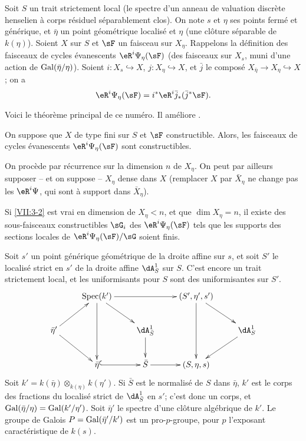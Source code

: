 Soit $S$ un trait strictement local (le spectre d'un anneau de valuation 
discrète henselien à corps résiduel séparablement clos). On note $s$ et 
$\eta$ ses points fermé et générique, et $\bar\eta$ un point 
géométrique localisé et $\eta$ (une clôture séparable de $k(\eta)$). 
Soient $X$ sur $S$ et $\sF$ un faisceau sur $X_\eta$. Rappelons la 
définition des faisceaux de cycles évanescents $\eR^i \Psi_\eta(\sF)$ (des 
faisceaux sur $X_s$, muni d'une action de $\operatorname{Gal}(\bar\eta/\eta)$). Soient 
$i:X_s\hookrightarrow X$, $j:X_\eta \hookrightarrow X$, et $\bar j$ le 
composé $X_{\bar\eta}\to X_\eta \hookrightarrow X$; on a 
\[
  \eR^i \Psi_\eta(\sF) = i^\ast \eR^i \bar j_\ast (\bar j^\ast \sF) \text{.} 
\]

Voici le théorème principal de ce numéro. Il améliore 
\cite[XIII 2.3.1, 2.4.2]{sga7}. 





\begin{theorem_}\label{VII:3-2}
On suppose que $X$ de type fini sur $S$ et $\sF$ constructible. Alors, les 
faisceaux de cycles évanescents $\eR^i \Psi_\eta(\sF)$ sont constructibles. 
\end{theorem_}

On procède par récurrence sur la dimension $n$ de $X_\eta$. On peut par 
ailleurs supposer -- et on suppose -- $X_\eta$ dense dans $X$ (remplacer $X$ 
par $\bar X_\eta$ ne change pas les $\eR^i \Psi$, qui sont à support dans 
$\bar X_\eta$). 





\begin{lemma_}\label{VII:3-3}
Si \ref{VII:3-2} est vrai en dimension de $X_\eta<n$, et que $\dim X_\eta=n$, 
il existe des sous-faisceaux constructibles $\sG_i$ des $\eR^i \Psi_\eta(\sF)$ 
tels que les supports des sections locales de $\eR^i\Psi_\eta(\sF)/\sG$ soient 
finis. 
\end{lemma_}

Soit $s'$ un point générique géométrique de la droite affine sur $s$, 
et soit $S'$ le localisé strict en $s'$ de la droite affine $\dA_S^1$ sur 
$S$. C'est encore un trait strictement local, et les uniformisants pour $S$ 
sont des uniformisantes sur $S'$. 
\[\xymatrix{
  & \spec(k') \ar[rr] \ar[dd] \ar[dr] 
    & & (S',\eta',s') \ar[dr] \ar[dd] \\
  \bar\eta' \ar[ur] \ar[dr] 
    & & \dA_{\bar S}^1 \ar[d]  
    & & \dA_S^1 \ar[dl] \\
  & \bar\eta\ar@{^{(}->}[r] 
    & \bar S \ar[r] 
    & (S,\eta,s) 
}\]
Soit $k'=k(\bar\eta)\otimes_{k(\eta)}k(\eta')$. Si $\bar S$ est le normalisé 
de $S$ dans $\bar\eta$, $k'$ est le corps des fractions du localisé strict 
de $\dA_{\bar S}^1$ en $s'$; c'est donc un corps, et 
$\operatorname{Gal}(\bar\eta/\eta)=\operatorname{Gal}(k'/\eta')$. Soit $\bar\eta'$ le spectre d'une 
clôture algébrique de $k'$. Le groupe de Galois $P=\operatorname{Gal}(\bar\eta'/k')$ est 
un pro-$p$-groupe, pour $p$ l'exposant caractéristique de $k(s)$. 





